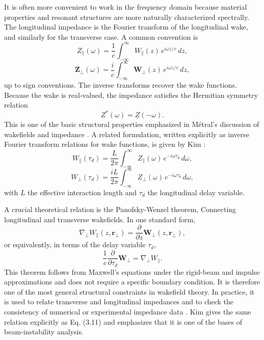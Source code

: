 \documentclass[11pt,a4paper]{article}
\begin{document}
\begin{sloppypar}
It is often more convenient to work in the frequency domain because material properties and resonant structures are more naturally characterized spectrally. The longitudinal impedance is the Fourier transform of the longitudinal wake, and similarly for the transverse case. A common convention is
\begin{equation}
Z_{\parallel}(\omega)
=
\frac{1}{c}
\int_{-\infty}^{\infty}
W_{\parallel}(z)\,e^{i\omega z/c}\,dz,
\label{eq:Zlong}
\end{equation}
\begin{equation}
\mathbf Z_{\perp}(\omega)
=
\frac{i}{c}
\int_{-\infty}^{\infty}
\mathbf W_{\perp}(z)\,e^{i\omega z/c}\,dz,
\label{eq:Ztrans}
\end{equation}
up to sign conventions. The inverse transforms recover the wake functions. Because the wake is real-valued, the impedance satisfies the Hermitian symmetry relation
\begin{equation}
Z^*(\omega)=Z(-\omega).
\label{eq:impedance_symmetry}
\end{equation}
This is one of the basic structural properties emphasized in Métral’s discussion of wakefields and impedance \cite{metral_wake_2021}. A related formulation, written explicitly as inverse Fourier transform relations for wake functions, is given by Kim \cite{kim_mbtrack2_cuda_2025}:
\begin{equation}
W_{\parallel}(\tau_d)
=
\frac{L}{2\pi}
\int_{-\infty}^{\infty}
Z_{\parallel}(\omega)\,e^{-i\omega \tau_d}\,d\omega,
\end{equation}
\begin{equation}
W_{\perp}(\tau_d)
=
\frac{iL}{2\pi}
\int_{-\infty}^{\infty}
Z_{\perp}(\omega)\,e^{-i\omega \tau_d}\,d\omega,
\end{equation}
with $L$ the effective interaction length and $\tau_d$ the longitudinal delay variable. 

A crucial theoretical relation is the Panofsky-Wenzel theorem, Connecting longitudinal and transverse wakefields. In one standard form,
\begin{equation}
\nabla_{\perp} W_{\parallel}(z,\mathbf r_{\perp})
=
\frac{\partial}{\partial z}\mathbf W_{\perp}(z,\mathbf r_{\perp}),
\label{eq:PW}
\end{equation}
or equivalently, in terms of the delay variable $\tau_d$,
\begin{equation}
\frac{1}{c}\frac{\partial}{\partial \tau_d}\mathbf W_{\perp}
=
\nabla_{\perp}W_{\parallel}.
\label{eq:PW_tau}
\end{equation}
This theorem follows from Maxwell’s equations under the rigid-beam and impulse approximations and does not require a specific boundary condition. It is therefore one of the most general structural constraints in wakefield theory. In practice, it is used to relate transverse and longitudinal impedances and to check the consistency of numerical or experimental impedance data \cite{metral_wake_2021}. Kim \cite{kim_mbtrack2_cuda_2025} gives the same relation explicitly as Eq. (3.11) and emphasizes that it is one of the bases of beam-instability analysis. 






\end{sloppypar}
\end{document}
